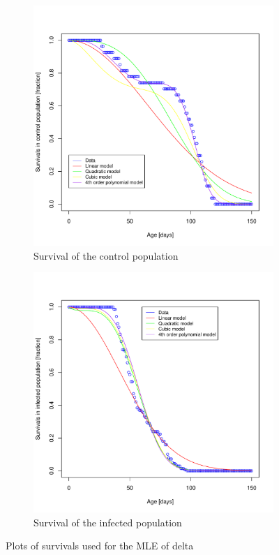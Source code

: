 \documentclass[10pt]{article}         %
\begin{document}
\begin{figure}[h]
\begin{subfigure}[b]{0.5\textwidth}
    \includegraphics[width=\textwidth]{Control_population_survival.pdf}
    \caption{Survival of the control population}
    \label{fig:subfigure_1}
  \end{subfigure}
  \begin{subfigure}[b]{0.5\textwidth}
    \includegraphics[width=\textwidth]{Infected_population_survival.pdf}
    \caption{Survival of the infected population}
    \label{fig:subfigure_2}
  \end{subfigure}
\caption{Plots of survivals used for the MLE of delta}
	\label{fig:survival_curve}
\end{figure}
\end{document}
